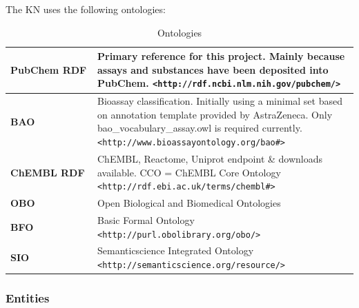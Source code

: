 The KN uses the following ontologies:

\begin{table}[]
\caption{Ontologies}
\label{tab:opddr_01}
\centering
\begin{tabular}{p{0.25\linewidth}p{0.75\linewidth}}
\hline
\textbf{PubChem RDF} & Primary reference for this project.  Mainly because assays and substances have been deposited into PubChem. 
\texttt{\textless http://rdf.ncbi.nlm.nih.gov/pubchem/\textgreater} \\
\hline
\textbf{BAO} & Bioassay classification.  Initially using a minimal set based on annotation template provided by AstraZeneca.  Only bao\_vocabulary\_assay.owl is required currently.
\texttt{\textless http://www.bioassayontology.org/bao\#\textgreater} \\
\hline
\textbf{ChEMBL RDF} & ChEMBL, Reactome, Uniprot endpoint \& downloads available.
CCO = ChEMBL Core Ontology
\texttt{\textless http://rdf.ebi.ac.uk/terms/chembl\#\textgreater} \\
\hline
\textbf{OBO} & Open Biological and Biomedical Ontologies \\
\hline
\textbf{BFO} &  Basic Formal Ontology \texttt{\textless http://purl.obolibrary.org/obo/\textgreater} \\
\hline
\textbf{SIO} & Semanticscience Integrated Ontology
\texttt{\textless http://semanticscience.org/resource/\textgreater} \\
\hline
\end{tabular}
\end{table}


\subsubsection{Entities}

